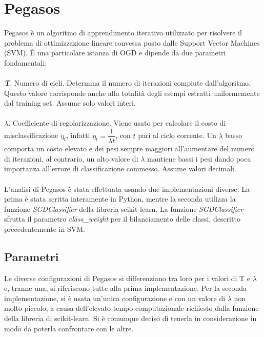 \documentclass[12pt,a4paper,oneside,hidelinks]{report}
\begin{document}
\section{Pegasos}
Pegasos è un algoritmo di apprendimento iterativo utilizzato per risolvere il problema di ottimizzazione lineare convessa posto dalle Support Vector Machines (SVM).
È una particolare istanza di OGD e dipende da due parametri fondamentali:

\paragraph*{}
\textbf{\textit{T}}. Numero di cicli. Determina il numero di iterazioni compiute dall'algoritmo. Questo valore corrisponde anche alla totalità degli esempi estratti uniformemente dal training set. Assume solo valori interi.

\paragraph*{}
$\mathbf{\mathit{\lambda}}$. Coefficiente di regolarizzazione. Viene usato per calcolare il costo di misclassificazione $\eta_t$, infatti $\eta_t = \dfrac{1}{\lambda t}$, con $t$ pari al ciclo corrente. Un $\lambda$ basso comporta un costo elevato e dei pesi sempre maggiori all'aumentare del numero di iterazioni, al contrario, un alto valore di $\lambda$ mantiene bassi i pesi dando poca importanza all'errore di classificazione commesso. Assume valori decimali.

\paragraph*{}
L'analisi di Pegasos è stata effettuata usando due implementazioni diverse. La prima è stata scritta interamente in Python, mentre la seconda utilizza la funzione \textit{SGDClassifier} della libreria scikit-learn.
La funzione \textit{SGDClassifier} sfrutta il parametro \textit{class\_weight} per il bilanciamento delle classi, descritto precedentemente in SVM.  

\subsection{Parametri}
Le diverse configurazioni di Pegasos si differenziano tra loro per i valori di T e $\lambda$ e, tranne una, si riferiscono tutte alla prima implementazione. Per la seconda implementazione, si è usata un'unica configurazione e con un valore di $\lambda$ non molto piccolo, a causa dell'elevato tempo computazionale richiesto dalla funzione della libreria di scikit-learn. Si è comunque deciso di tenerla in considerazione in modo da poterla confrontare con le altre.
\end{document}
